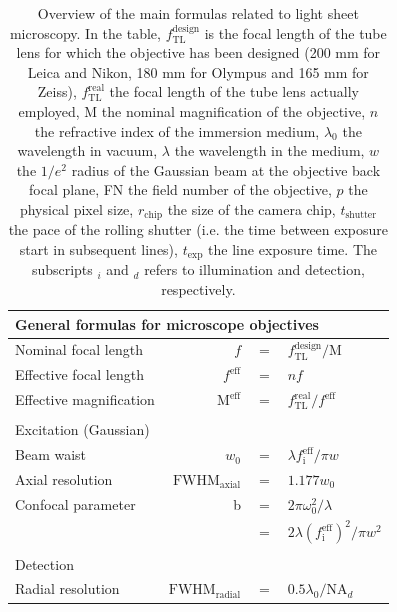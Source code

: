 \documentclass[12pt]{spieman}  %
\begin{document}
\begin{table}[t!]
	\centering
		\caption[Main formulas]{Overview of the main formulas related to light sheet microscopy. In the table, $f_{\text{TL}}^{\text{design}}$ is the focal length of the tube lens for which the objective has been designed (200 mm for Leica and Nikon, 180 mm for Olympus and 165 mm for Zeiss), $f_{\text{TL}}^{\text{real}}$ the focal length of the tube lens actually employed, $\text{M}$ the nominal magnification of the objective, $n$ the refractive index of the immersion medium, $\lambda_0$ the wavelength in vacuum, $\lambda$ the wavelength in the medium, $w$ the $1/e^2$ radius of the Gaussian beam at the objective back focal plane, FN the field number of the objective, $p$ the physical pixel size, $r_{\text{chip}}$ the size of the camera chip, $t_{\text{shutter}}$ the pace of the rolling shutter (i.e. the time between exposure start in subsequent lines), $ t_{\text{exp}}$ the line exposure time. The subscripts $_i$ and $_d$ refers to illumination and detection, respectively. \label{tab:resolution}}
		\begin{tabular}{lrcl}
		\\
		\multicolumn{4}{l}{General formulas for microscope objectives}\\\hline\hline 
		Nominal focal length							& $f$ 													& $=$		& $f_{\text{TL}}^{\text{design}}/\text{M}$				\\	
		Effective focal length						& $f^{\text{eff}}$							& $=$		& $nf$													\\
		Effective magnification						& $\text{M}^{\text{eff}}$				& $=$		& $f_{\text{TL}}^{\text{real}}/f^{\text{eff}}$			\\\\
		\multicolumn{4}{l}{Excitation (Gaussian)}\\\hline\hline	
		Beam waist												&$w_0$													& $=$ 	& $ \lambda f_{\text{i}}^{\text{eff}} / \pi w$				\\
		Axial resolution									&$\text{FWHM}_{\text{axial}}$		& $=$   & $1.177 w_0 $											\\
		Confocal parameter								& b															& $=$   & $2 \pi \omega_0^2 / \lambda$							\\
																			&  															& $=$   & $2 \lambda {(f_{\text{i}}^{\text{eff}})}^2 / \pi w^2 $	\\\\
		\multicolumn{4}{l}{Detection}\\\hline\hline  
		Radial resolution									&$\text{FWHM}_{\text{radial}}$	& $=$		& $0.5 \lambda_0 / \text{NA}_{d}$						\\

\end{tabular}
\end{table}
\end{document}
